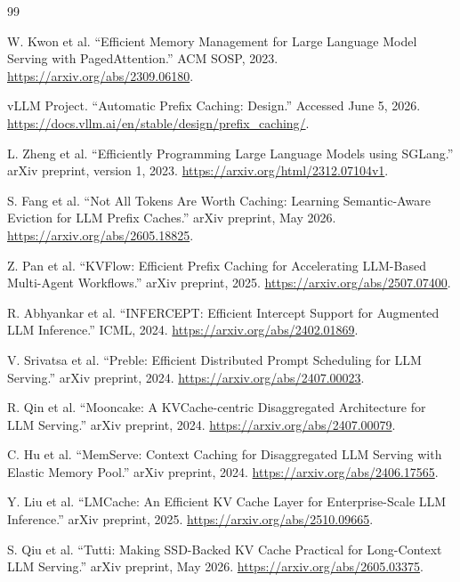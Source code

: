\documentclass[11pt]{article}
\begin{document}
\begin{thebibliography}{99}

W. Kwon et al.
\newblock ``Efficient Memory Management for Large Language Model Serving with
PagedAttention.''
\newblock ACM SOSP, 2023.
\newblock \url{https://arxiv.org/abs/2309.06180}.

vLLM Project.
\newblock ``Automatic Prefix Caching: Design.''
\newblock Accessed June 5, 2026.
\newblock \url{https://docs.vllm.ai/en/stable/design/prefix_caching/}.

L. Zheng et al.
\newblock ``Efficiently Programming Large Language Models using SGLang.''
\newblock arXiv preprint, version 1, 2023.
\newblock \url{https://arxiv.org/html/2312.07104v1}.

S. Fang et al.
\newblock ``Not All Tokens Are Worth Caching: Learning Semantic-Aware Eviction for LLM
Prefix Caches.''
\newblock arXiv preprint, May 2026.
\newblock \url{https://arxiv.org/abs/2605.18825}.

Z. Pan et al.
\newblock ``KVFlow: Efficient Prefix Caching for Accelerating LLM-Based Multi-Agent
Workflows.''
\newblock arXiv preprint, 2025.
\newblock \url{https://arxiv.org/abs/2507.07400}.

R. Abhyankar et al.
\newblock ``INFERCEPT: Efficient Intercept Support for Augmented LLM Inference.''
\newblock ICML, 2024.
\newblock \url{https://arxiv.org/abs/2402.01869}.

V. Srivatsa et al.
\newblock ``Preble: Efficient Distributed Prompt Scheduling for LLM Serving.''
\newblock arXiv preprint, 2024.
\newblock \url{https://arxiv.org/abs/2407.00023}.

R. Qin et al.
\newblock ``Mooncake: A KVCache-centric Disaggregated Architecture for LLM Serving.''
\newblock arXiv preprint, 2024.
\newblock \url{https://arxiv.org/abs/2407.00079}.

C. Hu et al.
\newblock ``MemServe: Context Caching for Disaggregated LLM Serving with Elastic Memory
Pool.''
\newblock arXiv preprint, 2024.
\newblock \url{https://arxiv.org/abs/2406.17565}.

Y. Liu et al.
\newblock ``LMCache: An Efficient KV Cache Layer for Enterprise-Scale LLM Inference.''
\newblock arXiv preprint, 2025.
\newblock \url{https://arxiv.org/abs/2510.09665}.

S. Qiu et al.
\newblock ``Tutti: Making SSD-Backed KV Cache Practical for Long-Context LLM Serving.''
\newblock arXiv preprint, May 2026.
\newblock \url{https://arxiv.org/abs/2605.03375}.


\end{thebibliography}
\end{document}
